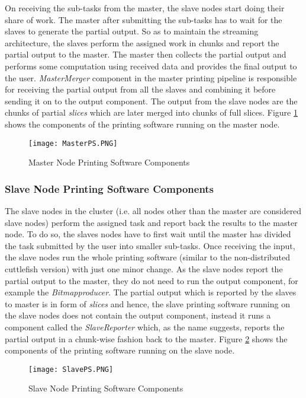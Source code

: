 On receiving the sub-tasks from the master, the slave nodes start doing their share of work. The master after submitting the sub-tasks has to wait for the slaves to generate the partial output. So as to maintain the streaming architecture, the slaves perform the assigned work in chunks and report the partial output to the master. The master then collects the partial output and performs some computation using received data and provides the final output to the user. \textit{MasterMerger} component in the master printing pipeline is responsible for receiving the partial output from all the slaves and combining it before sending it on to the output component. The output from the slave nodes are the chunks of partial \textit{slices} which are later merged into chunks of full slices. Figure \ref{fig:MasterPS} shows the components of the printing software running on the master node.
\begin{figure}[ht!]
\centering
\texttt{[image: MasterPS.PNG]}
\caption{Master Node Printing Software Components }
\label{fig:MasterPS}
\end{figure}


\subsubsection{Slave Node Printing Software Components}

The slave nodes in the cluster (i.e. all nodes other than the master are considered slave nodes) perform the assigned task and report back the results to the master node. To do so, the slaves nodes have to first wait until the master has divided the task submitted by the user into smaller sub-tasks. Once receiving the input, the slave nodes run the whole printing software (similar to the non-distributed cuttlefish version) with just one minor change. As the slave nodes report the partial output to the master, they do not need to run the output component, for example the \textit{Bitmapproducer}. The partial output which is reported by the slaves to master is in form of \textit{slices} and hence, the slave printing software running on the slave nodes does not contain the output component, instead it runs a component called the \textit{SlaveReporter} which, as the name suggests, reports the partial output in a chunk-wise fashion back to the master. Figure \ref{fig:SlavePS} shows the components of the printing software running on the slave node.
\begin{figure}[ht!]
\centering
\texttt{[image: SlavePS.PNG]}
\caption{Slave Node Printing Software Components }
\label{fig:SlavePS}
\end{figure}

